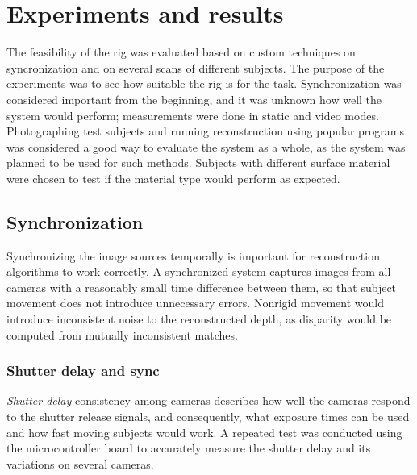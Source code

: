 \section{Experiments and results} \label{sec:experiments}

The feasibility of the rig was evaluated based on custom techniques on syncronization and on several scans of different subjects.
The purpose of the experiments was to see how suitable the rig is for the task.
Synchronization was considered important from the beginning, and it was unknown how well the system would perform; measurements were done in static and video modes.
Photographing test subjects and running reconstruction using popular programs was considered a good way to evaluate the system as a whole, as the system was planned to be used for such methods.
Subjects with different surface material were chosen to test if the material type would perform as expected.

\subsection{Synchronization}

Synchronizing the image sources temporally is important for reconstruction algorithms to work correctly.
A synchronized system captures images from all cameras with a reasonably small time difference between them, so that subject movement does not introduce unnecessary errors.
Nonrigid movement would introduce inconsistent noise to the reconstructed depth, as disparity would be computed from mutually inconsistent matches.

\subsubsection{Shutter delay and sync} \label{sec:shutterdelaymeas}

\emph{Shutter delay} consistency among cameras describes how well the cameras respond to the shutter release signals, and consequently, what exposure times can be used and how fast moving subjects would work.
A repeated test was conducted using the microcontroller board to accurately measure the shutter delay and its variations on several cameras.

